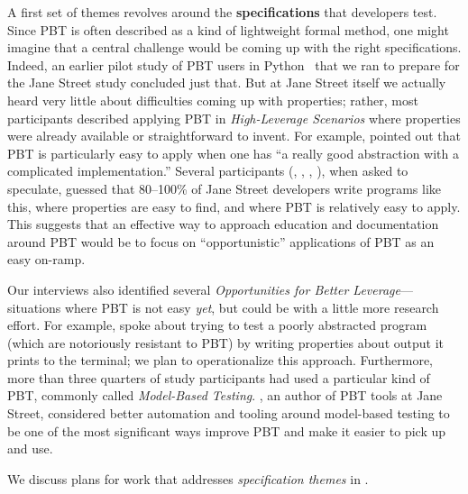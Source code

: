\newcommand{\proptheme}[1]{{\color{nord-orange} \em #1}}
\newcommand{\gentheme}[1]{{\color{nord-green} \em #1}}
\newcommand{\evaltheme}[1]{{\color{nord-purple} \em #1}}
A first set of
themes revolves around the {\bf specifications} that developers test.
Since
PBT is often described as a kind of lightweight formal method, one
might imagine that a central challenge would be coming up with the
right specifications. Indeed, an earlier pilot study of PBT users in
Python~\cite{PilotHypothesisStudy} that we ran to prepare for the Jane Street
study\iflater{}\fi{}
concluded just that.
  But at Jane Street itself
we actually heard very little about difficulties coming up with
properties; rather, most participants described applying PBT in
\proptheme{High-Leverage Scenarios} where properties were already
available or straightforward to invent.  For example,  pointed out
that PBT is particularly easy to apply when one has ``a really good abstraction
with a complicated implementation.''
Several participants (, ,
, ), when asked to speculate, guessed
that 80--100\% of Jane Street
developers write programs like this, where properties are easy to find, and
where PBT is relatively easy to apply.  This suggests that an effective way to
approach education and documentation around PBT would be to focus on
``opportunistic'' applications of PBT as an easy on-ramp.

Our interviews also identified several \proptheme{Opportunities for Better
Leverage}---situations where PBT is not easy {\em yet}, but could be with a
little more research effort. For example,  spoke about trying to
test a poorly abstracted program (which are notoriously resistant to PBT) by
writing properties about output it prints to the terminal; we plan to
operationalize this approach.
Furthermore, more than three quarters of study participants had used a
particular kind of PBT, commonly called
\proptheme{Model-Based Testing}.
, an author of PBT tools at Jane Street, considered better
automation and tooling around model-based testing to be one of the most
significant ways improve PBT and make it easier to pick up and use.

We discuss plans for work that addresses \proptheme{specification
  themes} in .

